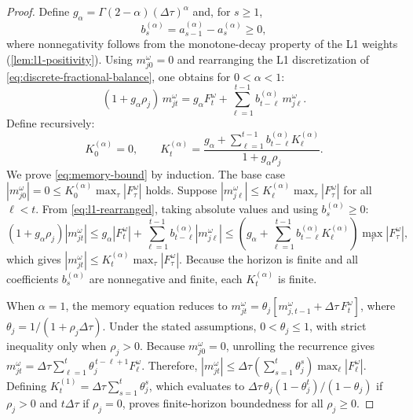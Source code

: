 \documentclass[11pt,a4paper]{article}
\begin{document}
\begin{proof}
Define \(g_\alpha=\Gamma(2-\alpha)(\Delta\tau)^\alpha\) and, for
\(s\geq1\),
\[
  b_s^{(\alpha)}
  =
  a_{s-1}^{(\alpha)}-a_s^{(\alpha)}
  \geq0,
\]
where nonnegativity follows from the monotone-decay property of the L1
weights (\cref{lem:l1-positivity}). Using \(m_{j0}^{\omega}=0\) and
rearranging the L1 discretization of
\cref{eq:discrete-fractional-balance}, one obtains for \(0<\alpha<1\):
\begin{equation}
  (1+g_\alpha\rho_j)\,m_{jt}^{\omega}
  =
  g_\alpha F_t^\omega
  +
  \sum_{\ell=1}^{t-1}
  b_{t-\ell}^{(\alpha)}\,m_{j\ell}^{\omega}.
  \label{eq:l1-rearranged}
\end{equation}
Define recursively:
\[
  K_0^{(\alpha)}=0,
  \qquad
  K_t^{(\alpha)}
  =
  \frac{
    g_\alpha
    +
    \displaystyle\sum_{\ell=1}^{t-1}
    b_{t-\ell}^{(\alpha)}K_\ell^{(\alpha)}
  }{
    1+g_\alpha\rho_j
  }.
\]
We prove \cref{eq:memory-bound} by induction. The base case
\(|m_{j0}^{\omega}|=0\leq K_0^{(\alpha)}\max_\tau|F_\tau^\omega|\)
holds. Suppose \(|m_{j\ell}^{\omega}|\leq
K_\ell^{(\alpha)}\max_\tau|F_\tau^\omega|\) for all \(\ell<t\).
From \cref{eq:l1-rearranged}, taking absolute values and using
\(b_s^{(\alpha)}\geq0\):
\[
  (1+g_\alpha\rho_j)|m_{jt}^{\omega}|
  \leq
  g_\alpha|F_t^\omega|
  +
  \sum_{\ell=1}^{t-1}b_{t-\ell}^{(\alpha)}|m_{j\ell}^{\omega}|
  \leq
  \left(
    g_\alpha
    +
    \sum_{\ell=1}^{t-1}b_{t-\ell}^{(\alpha)}K_\ell^{(\alpha)}
  \right)
  \max_\tau|F_\tau^\omega|,
\]
which gives
\(|m_{jt}^{\omega}|\leq K_t^{(\alpha)}\max_\tau|F_\tau^\omega|\).
Because the horizon is finite and all coefficients \(b_s^{(\alpha)}\)
are nonnegative and finite, each \(K_t^{(\alpha)}\) is finite.

When \(\alpha=1\), the memory equation reduces to
\(m_{jt}^{\omega}
=
\theta_j
[m_{j,t-1}^{\omega}
+\Delta\tau\,F_t^\omega]\),
where \(\theta_j=1/(1+\rho_j\Delta\tau)\). Under the stated assumptions,
\(0<\theta_j\leq1\), with strict inequality only when \(\rho_j>0\).
Because \(m_{j0}^{\omega}=0\), unrolling the recurrence gives
\(m_{jt}^{\omega}=\Delta\tau\sum_{\ell=1}^{t}\theta_j^{\,t-\ell+1}F_\ell^\omega\).
Therefore, \(|m_{jt}^{\omega}|\leq\Delta\tau(\sum_{s=1}^{t}\theta_j^s)\max_\ell|F_\ell^\omega|\).
Defining \(K_t^{(1)}=\Delta\tau\sum_{s=1}^{t}\theta_j^s\), which evaluates to
\(\Delta\tau\,\theta_j(1-\theta_j^t)/(1-\theta_j)\) if \(\rho_j>0\) and
\(t\Delta\tau\) if \(\rho_j=0\), proves finite-horizon boundedness for all
\(\rho_j\geq0\).
\end{proof}
\end{document}
